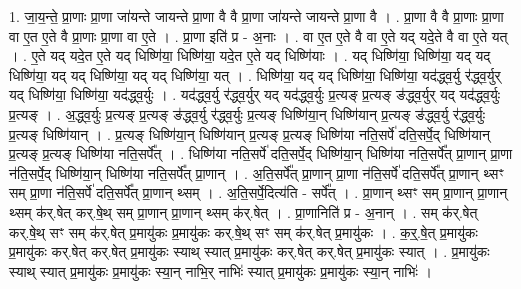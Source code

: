 \documentclass[17pt]{extarticle}
\begin{document}
1. जा॒य॒न्ते॒ प्रा॒णाः प्रा॒णा जा॑यन्ते जायन्ते प्रा॒णा वै वै प्रा॒णा जा॑यन्ते जायन्ते प्रा॒णा वै । . प्रा॒णा वै वै प्रा॒णाः प्रा॒णा वा ए॒त ए॒ते वै प्रा॒णाः प्रा॒णा वा ए॒ते । . प्रा॒णा इति॑ प्र - अ॒नाः । . वा ए॒त ए॒ते वै वा ए॒ते यद् यदे॒ते वै वा ए॒ते यत् । . ए॒ते यद् यदे॒त ए॒ते यद् धिष्णि॑या॒ धिष्णि॑या॒ यदे॒त ए॒ते यद् धिष्णि॑याः । . यद् धिष्णि॑या॒ धिष्णि॑या॒ यद् यद् धिष्णि॑या॒ यद् यद् धिष्णि॑या॒ यद् यद् धिष्णि॑या॒ यत् । . धिष्णि॑या॒ यद् यद् धिष्णि॑या॒ धिष्णि॑या॒ यद॑द्ध्व॒र्यु र॑द्ध्व॒र्युर् यद् धिष्णि॑या॒ धिष्णि॑या॒ यद॑द्ध्व॒र्युः । . यद॑द्ध्व॒र्यु र॑द्ध्व॒र्युर् यद् यद॑द्ध्व॒र्युः प्र॒त्यङ् प्र॒त्यङ् ङ॑द्ध्व॒र्युर् यद् यद॑द्ध्व॒र्युः प्र॒त्यङ् । . अ॒द्ध्व॒र्युः प्र॒त्यङ् प्र॒त्यङ् ङ॑द्ध्व॒र्यु र॑द्ध्व॒र्युः प्र॒त्यङ् धिष्णि॑या॒न् धिष्णि॑यान् प्र॒त्यङ् ङ॑द्ध्व॒र्यु र॑द्ध्व॒र्युः प्र॒त्यङ् धिष्णि॑यान् । . प्र॒त्यङ् धिष्णि॑या॒न् धिष्णि॑यान् प्र॒त्यङ् प्र॒त्यङ् धिष्णि॑या नति॒सर्पे॑ दति॒सर्पे॒द् धिष्णि॑यान् प्र॒त्यङ् प्र॒त्यङ् धिष्णि॑या नति॒सर्पे᳚त् । . धिष्णि॑या नति॒सर्पे॑ दति॒सर्पे॒द् धिष्णि॑या॒न् धिष्णि॑या नति॒सर्पे᳚त् प्रा॒णान् प्रा॒णा न॑ति॒सर्पे॒द् धिष्णि॑या॒न् धिष्णि॑या नति॒सर्पे᳚त् प्रा॒णान् । . अ॒ति॒सर्पे᳚त् प्रा॒णान् प्रा॒णा न॑ति॒सर्पे॑ दति॒सर्पे᳚त् प्रा॒णान् थ्सꣳ सम् प्रा॒णा न॑ति॒सर्पे॑ दति॒सर्पे᳚त् प्रा॒णान् थ्सम् । . अ॒ति॒सर्पे॒दित्य॑ति - सर्पे᳚त् । . प्रा॒णान् थ्सꣳ सम् प्रा॒णान् प्रा॒णान् थ्सम् क॑र्.षेत् कर्.षे॒थ् सम् प्रा॒णान् प्रा॒णान् थ्सम् क॑र्.षेत् । . प्रा॒णानिति॑ प्र - अ॒नान् । . सम् क॑र्.षेत् कर्.षे॒थ् सꣳ सम् क॑र्.षेत् प्र॒मायु॑कः प्र॒मायु॑कः कर्.षे॒थ् सꣳ सम् क॑र्.षेत् प्र॒मायु॑कः । . क॒र्॒.षे॒त् प्र॒मायु॑कः प्र॒मायु॑कः कर्.षेत् कर्.षेत् प्र॒मायु॑कः स्याथ् स्यात् प्र॒मायु॑कः कर्.षेत् कर्.षेत् प्र॒मायु॑कः स्यात् । . प्र॒मायु॑कः स्याथ् स्यात् प्र॒मायु॑कः प्र॒मायु॑कः स्या॒न् नाभि॒र् नाभिः॑ स्यात् प्र॒मायु॑कः प्र॒मायु॑कः स्या॒न् नाभिः॑ । \newline
\end{document}
